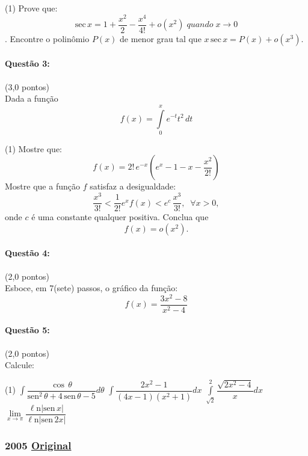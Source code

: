 \documentclass[12pt,a4paper]{article}
\newcommand{\modu}[1]{\vert #1 \vert}
\newcommand{\Ln}{\ell\mathrm{n}}
\newcommand{\original}[1]{\tiny \href{#1}{Original} \normalsize}
\begin{document}
\begin{tasks}(1)
\task Prove que:
$$\mathrm{sec}\,x=1+\dfrac{x^2}{2}-\dfrac{x^4}{4!}+o\left( x^2 \right)\; quando\; x \to 0$$.
\task Encontre o polinômio $P(x)$ de menor grau tal que $x\,\mathrm{sec}\,x=P(x)+o\left( x^3 \right)$.
\end{tasks}

\paragraph{Questão 3:}(3,0 pontos)\\
Dada a função
$$f(x)=\displaystyle\int\limits_{0}^{x}e^{-t}t^2\,dt$$

\begin{tasks}(1)
\task Mostre que:
$$f(x)=2!\,e^{-x}\left(e^x-1-x-\dfrac{x^2}{2!}\right)$$
\task Mostre que a função $f$ satisfaz a desigualdade:
$$\dfrac{x^3}{3!}<\dfrac{1}{2!}e^xf(x)<e^c\,\dfrac{x^3}{3!},\;\;\forall x >0,$$
onde $c$ é uma constante qualquer positiva.
\task Conclua que
$$f(x)=o\left( x^2 \right).$$
\end{tasks}

\paragraph{Questão 4:}(2,0 pontos)\\
Esboce, em 7(sete) passos, o gráfico da função:
$$f(x)=\dfrac{3x^2-8}{x^2-4}$$

\paragraph{Questão 5:}(2,0 pontos)\\
Calcule:

\begin{tasks}(1)
\task $\displaystyle\int\dfrac{\cos\,\theta}{\mathrm{sen}^2\,\theta+4\,\mathrm{sen}\,\theta-5}d\theta$
\task $\displaystyle\int\dfrac{2x^2-1}{(4x-1)(x^2+1)}dx$
\task $\displaystyle\int\limits_{\sqrt{2}}^{2}\dfrac{\sqrt{2x^2-4}}{x}dx$
\task $\lim\limits_{x \to \pi}\dfrac{\Ln \modu{\mathrm{sen}\,x}}{\Ln \modu{\mathrm{sen}\,2x}}$
\end{tasks}


\newpage

\subsubsection{2005 \original{https://drive.google.com/open?id=1t9ZBqOJ-T4vh2t153EDWb7GldmQsIGmC}}
\end{document}
